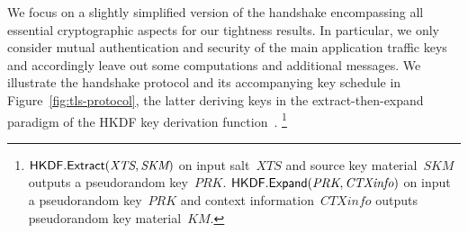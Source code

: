 We focus on a slightly simplified version of the handshake encompassing all essential cryptographic aspects for our tightness results.
In particular, we only consider mutual authentication and security of the main application traffic keys%
 and accordingly leave out some computations and additional messages.
We illustrate the handshake protocol and its accompanying key schedule in Figure~\ref{fig:tls-protocol}, the latter deriving keys in the extract-then-expand paradigm of the HKDF key derivation function~\cite{C:Krawczyk10}.%
\footnote{%
%
$\mathsf{HKDF}.\mathsf{Extract}(\textit{XTS},\allowbreak \textit{SKM})$ on input salt~$\textit{XTS}$ and source key material~$\textit{SKM}$ outputs a pseudorandom key~$\textit{PRK}$.
$\mathsf{HKDF}.\mathsf{Expand}(\textit{PRK},\allowbreak \textit{CTXinfo})$ on input a pseudorandom key~$\textit{PRK}$ and context information~$\textit{CTXinfo}$ outputs pseudorandom key material~$\textit{KM}$.}

